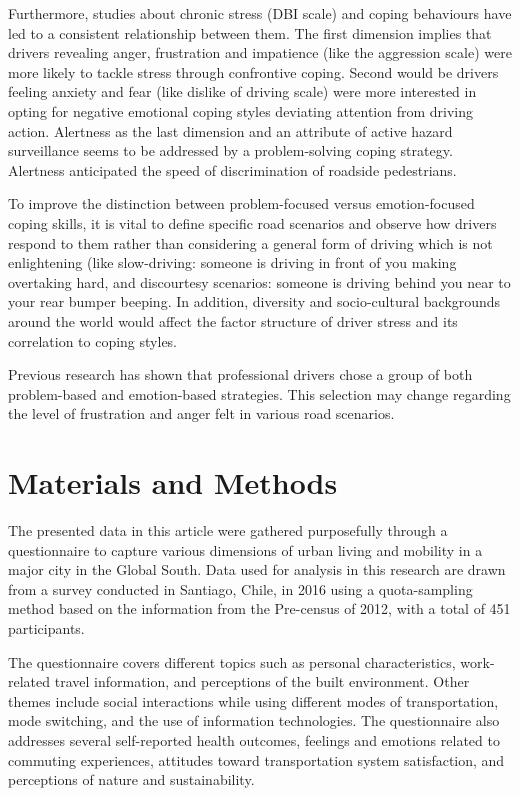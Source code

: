 \documentclass[
11pt, %
oneside, %
english, %
singlespacing, %
]{macthesis} %
\begin{document}
Furthermore, studies about chronic stress (DBI scale) and coping behaviours have led to a consistent relationship between them. The first dimension implies that drivers revealing anger, frustration and impatience (like the aggression scale) were more likely to tackle stress through confrontive coping. Second would be drivers feeling anxiety and fear (like dislike of driving scale) were more interested in opting for negative emotional coping styles deviating attention from driving action. Alertness as the last dimension and an attribute of active hazard surveillance seems to be addressed by a problem-solving coping strategy. Alertness anticipated the speed of discrimination of roadside pedestrians.

To improve the distinction between problem-focused versus emotion-focused coping skills, it is vital to define specific road scenarios and observe how drivers respond to them rather than considering a general form of driving which is not enlightening (like slow-driving: someone is driving in front of you making overtaking hard, and discourtesy scenarios: someone is driving behind you near to your rear bumper beeping. In addition, diversity and socio-cultural backgrounds around the world would affect the factor structure of driver stress and its correlation to coping styles.

Previous research has shown that professional drivers chose a group of both problem-based and emotion-based strategies. This selection may change regarding the level of frustration and anger felt in various road scenarios.

\hypertarget{materials-and-methods}{%
\section{Materials and Methods}\label{materials-and-methods}}

The presented data in this article were gathered purposefully through a questionnaire to capture various dimensions of urban living and mobility in a major city in the Global South. Data used for analysis in this research are drawn from a survey conducted in Santiago, Chile, in 2016 using a quota-sampling method based on the information from the Pre-census of 2012, with a total of 451 participants.

The questionnaire covers different topics such as personal characteristics, work-related travel information, and perceptions of the built environment. Other themes include social interactions while using different modes of transportation, mode switching, and the use of information technologies. The questionnaire also addresses several self-reported health outcomes, feelings and emotions related to commuting experiences, attitudes toward transportation system satisfaction, and perceptions of nature and sustainability.
\end{document}
